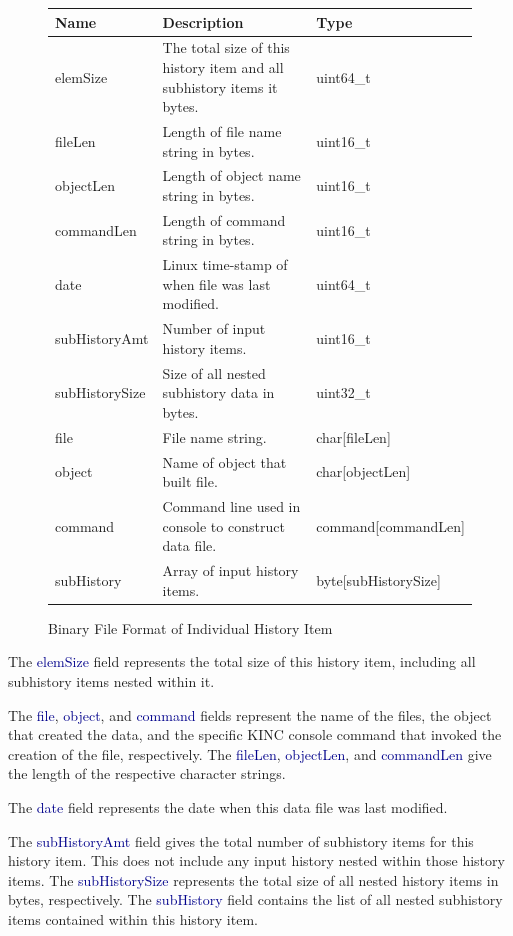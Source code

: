 \documentclass[10pt]{article}
\providecommand{\h}[1]{\textcolor{darkblue}{#1}}
\begin{document}
\begin{figure}[H]
\begin{mdframed}[style=btable]
\begin{tabularx}{\textwidth}{|l|X|l|}
\hline
\textbf{Name} & \textbf{Description} & \textbf{Type} \\
\hline
elemSize & The total size of this history item and all subhistory items it 
bytes. & uint64\_t \\
\hline
fileLen & Length of file name string in bytes. & uint16\_t \\
\hline
objectLen & Length of object name string in bytes. & uint16\_t \\
\hline
commandLen & Length of command string in bytes. & uint16\_t \\
\hline
date & Linux time-stamp of when file was last modified. & uint64\_t \\
\hline
subHistoryAmt & Number of input history items. & uint16\_t \\
\hline
subHistorySize & Size of all nested subhistory data in bytes. & uint32\_t \\
\hline
file & File name string. & char[fileLen] \\
\hline
object & Name of object that built file. & char[objectLen] \\
\hline
command & Command line used in console to construct data file. & 
command[commandLen] \\
\hline
subHistory & Array of input history items. & byte[subHistorySize] \\
\hline
\end{tabularx}
\end{mdframed}
\caption{Binary File Format of Individual History Item}
\label{fig:kincdata:history}
\end{figure}

The \h{elemSize} field represents the total size of this history item, 
including all subhistory items nested within it.

The \h{file}, \h{object}, and \h{command} fields represent the name of the 
files, the object that created the data, and the specific KINC console command 
that invoked the creation of the file, respectively. The \h{fileLen}, 
\h{objectLen}, and \h{commandLen} give the length of the respective character 
strings.

The \h{date} field represents the date when this data file was last modified.

The \h{subHistoryAmt} field gives the total number of subhistory items for 
this history item. This does not include any input history nested within those 
history items. The \h{subHistorySize} represents the total size of all nested 
history items in bytes, respectively. The \h{subHistory} field contains the 
list of all nested subhistory items contained within this history item.
\end{document}
